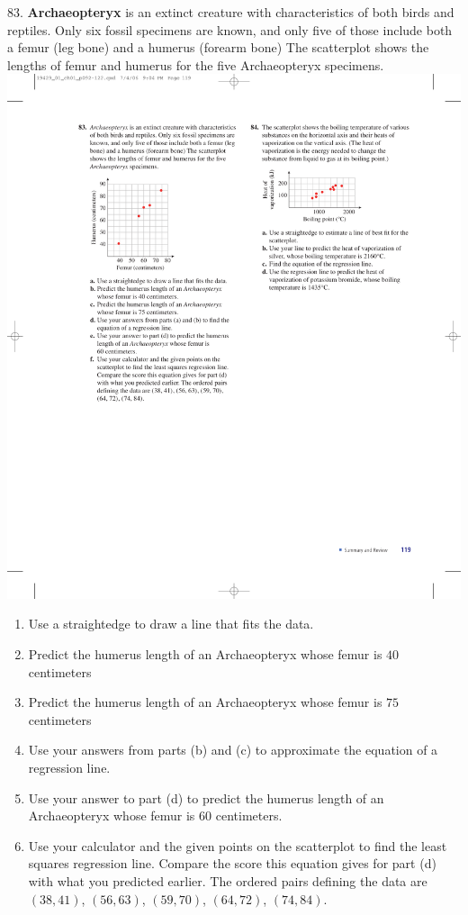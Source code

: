 \documentclass[10pt,]{book}
\newcommand{\terminology}[1]{\textbf{#1}}
\theoremstyle{plain}
\theoremstyle{definition}
\theoremstyle{definition}
\theoremstyle{definition}
\theoremstyle{definition}
\numberwithin{equation}{part}
\begin{document}
\begin{exerciselist}
\begin{enumerate}[label=*\alph**]
\end{enumerate}
%
\par\smallskip
\item[83.]\hypertarget{exercise-479}{}\terminology{Archaeopteryx} is an extinct creature with characteristics of both birds and reptiles. Only six fossil specimens are known, and only five of those include both a femur (leg bone) and a humerus (forearm bone) The scatterplot shows the lengths of femur and humerus for the five Archaeopteryx specimens. \includegraphics[width=0.45\linewidth]{images/fig-chap1-rev-83}
 \leavevmode%
\begin{enumerate}[label=*\alph**]
\item\hypertarget{li-1680}{}Use a straightedge to draw a line that fits the data.%
\item\hypertarget{li-1681}{}Predict the humerus length of an Archaeopteryx whose femur is \(40\) centimeters%
\item\hypertarget{li-1682}{}Predict the humerus length of an Archaeopteryx whose femur is \(75\) centimeters%
\item\hypertarget{li-1683}{}Use your answers from parts (b) and (c) to approximate the equation of a regression line.%
\item\hypertarget{li-1684}{}Use your answer to part (d) to predict the humerus length of an Archaeopteryx whose femur is \(60\) centimeters.%
\item\hypertarget{li-1685}{}Use your calculator and the given points on the scatterplot to find the least squares regression line. Compare the score this equation gives for part (d) with what you predicted earlier. The ordered pairs defining the data are \((38, 41)\), \((56, 63)\), \((59, 70)\), \((64, 72)\), \((74, 84)\).%
\end{enumerate}
%
\par\smallskip
\par\smallskip

\end{exerciselist}
\end{document}
